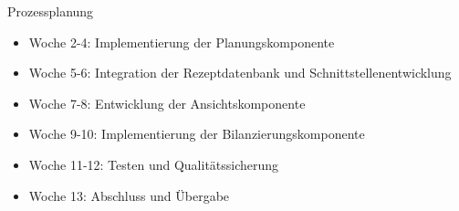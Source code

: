\documentclass{article}
\begin{document}
\begin{exercise}{Prozessplanung}
\begin{solution}
\begin{enumerate}
\begin{itemize}
              \item Woche 2-4: Implementierung der Planungskomponente
              \item Woche 5-6: Integration der Rezeptdatenbank und Schnittstellenentwicklung
              \item Woche 7-8: Entwicklung der Ansichtskomponente
              \item Woche 9-10: Implementierung der Bilanzierungskomponente
              \item Woche 11-12: Testen und Qualitätssicherung
              \item Woche 13: Abschluss und Übergabe
            \end{itemize}
    \end{enumerate}
  \end{solution}
\end{exercise}
\end{document}
